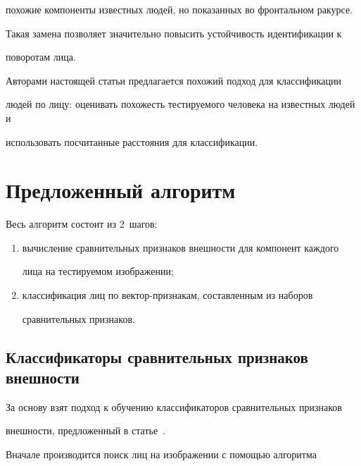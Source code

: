 похожие компоненты известных людей, но показанных во фронтальном ракурсе. 


Такая замена позволяет значительно повысить устойчивость идентификации к 


поворотам лица.





Авторами настоящей статьи предлагается похожий подход для классификации 


людей по лицу: оценивать похожесть тестируемого человека на известных людей и 


использовать посчитанные расстояния для классификации.





\section{Предложенный алгоритм}





Весь алгоритм состоит из 2~шагов:


\begin{enumerate}[(1)]


\item вычисление сравнительных признаков внешности для компонент каждого 


лица на тестируемом изображении;


\item классификация лиц по вектор-признакам, составленным из наборов 


сравнительных признаков.


\end{enumerate}





\subsection{Классификаторы сравнительных признаков внешности}





За основу взят подход к обучению классификаторов сравнительных признаков 


внешности, предложенный в статье~\cite{10-k}.





Вначале производится поиск лиц на изображении с помощью алгоритма 



